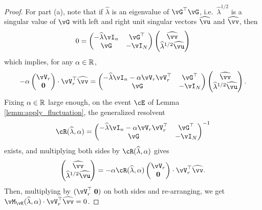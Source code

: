 \begin{proof}
For part (a), note that if $\widehat\lambda$ is an eigenvalue of $\vG^\top \vG$,
i.e.\ $\widehat\lambda^{1/2}$ is a singular value of $\vG$ with left and
right unit singular vectors $\widehat \vu$ and $\widehat\vv$, then
\[0=\begin{pmatrix} -\widehat\lambda \vI_n & \vG^\top \\ \vG & -\vI_N \end{pmatrix}
\begin{pmatrix} \widehat\vv \\ \widehat\lambda^{1/2}\widehat\vu \end{pmatrix}\]
which implies, for any $\alpha \in \mathbb{R}$,
\[{-}\alpha\begin{pmatrix} \vV_r \\ \mathbf{0} \end{pmatrix}
\cdot \vV_r^\top \widehat\vv=\begin{pmatrix} -\widehat\lambda\vI_n-\alpha\vV_r\vV_r^\top & \vG^\top \\ \vG & -\vI_N \end{pmatrix}
\begin{pmatrix} \widehat\vv \\ \widehat\lambda^{1/2}\widehat\vu \end{pmatrix}.\]
Fixing $\alpha \in \mathbb{R}$ large enough, on the event $\cE$
of Lemma \ref{lemm:apply_fluctuation}, the generalized resolvent
\[\vcR(\widehat\lambda,\alpha)=\begin{pmatrix} -\widehat\lambda\vI_n-\alpha\vV_r\vV_r^\top & \vG^\top \\ \vG & -\vI_N
\end{pmatrix}^{-1}\]
exists, and multiplying both sides by $\vcR(\widehat\lambda,\alpha)$ gives
\begin{equation}\label{eq:eigequation}
\begin{pmatrix} \widehat\vv \\ \widehat\lambda^{1/2}\widehat\vu \end{pmatrix}
=-\alpha \vcR(\widehat\lambda,\alpha)\begin{pmatrix}\vV_r \\ \mathbf{0} \end{pmatrix}
\cdot \vV_r^\top \widehat\vv.
\end{equation}
Then, multiplying by $(\vV_r^\top\;\mathbf{0})$ on both sides and re-arranging, we get
$\vM_{\vK}(\widehat\lambda,\alpha) \cdot \vV_r^\top \widehat \vv=0$.


\end{proof}
